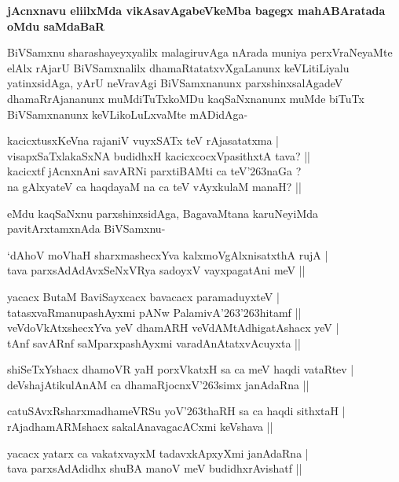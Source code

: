 {\bf jAcnxnavu eliilxMda vikAsavAgabeVkeMba bagegx mahABAratada oMdu saMdaBaR}

BiVSamxnu sharashayeyxyalilx malagiruvAga nArada muniya perxVraNeyaMte elAlx rAjarU BiVSamxnalilx dhamaRtatatxvXgaLanunx keVLitiLiyalu yatinxsidAga, yArU neVravAgi BiVSamxnanunx parxshinxsalAgadeV dhamaRrAjananunx muMdiTuTxkoMDu kaqSaNxnanunx muMde biTuTx BiVSamxnanunx keVLikoLuLxvaMte mADidAga-

\begin{shloka}
kacicxtusxKeVna rajaniV vuyxSATx teV rAjasatatxma |\\
visapxSaTxlakaSxNA budidhxH kacicxcocxVpasithxtA tava? ||\\
kacicxtf jAcnxnAni savARNi parxtiBAMti ca teV\char'263naGa ?\\
na gAlxyateV ca haqdayaM na ca teV vAyxkulaM manaH? ||
\end{shloka} 

eMdu kaqSaNxnu parxshinxsidAga, BagavaMtana karuNeyiMda pavitArxtamxnAda BiVSamxnu-

\begin{shloka}
`dAhoV moVhaH sharxmashecxYva kalxmoVgAlxnisatxthA rujA |\\
tava parxsAdAdAvxSeNxVRya sadoyxV vayxpagatAni meV ||
\end{shloka}

\begin{shloka}
yacacx ButaM BaviSayxcacx bavacacx paramaduyxteV |\\
tatasxvaRmanupashAyxmi pANw PalamivA\char'263\char'263hitamf ||\\
veVdoVkAtxshecxYva yeV dhamARH veVdAMtAdhigatAshacx yeV |\\
tAnf savARnf saMparxpashAyxmi varadAnAtatxvAcuyxta ||
\end{shloka}

\begin{shloka}
shiSeTxYshacx dhamoVR yaH porxVkatxH sa ca meV haqdi vataRtev |\\
deVshajAtikulAnAM ca dhamaRjocnxV\char'263simx janAdaRna ||
\end{shloka}

\begin{shloka}
catuSAvxRsharxmadhameVRSu yoV\char'263thaRH sa ca haqdi sithxtaH |\\
rAjadhamARMshacx sakalAnavagacACxmi keVshava ||
\end{shloka}

\begin{shloka}
yacacx yatarx ca vakatxvayxM tadavxkApxyXmi janAdaRna |\\
tava parxsAdAdidhx shuBA manoV meV budidhxrAvishatf ||
\end{shloka}

